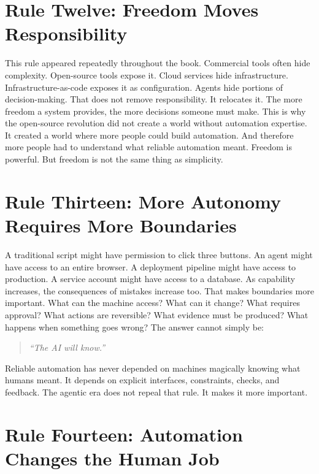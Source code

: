 \documentclass[11pt,twoside]{book}
\begin{document}
\section*{Rule Twelve: Freedom Moves Responsibility}

This rule appeared repeatedly throughout the book.
Commercial tools often hide complexity.
Open-source tools expose it.
Cloud services hide infrastructure.
Infrastructure-as-code exposes it as configuration.
Agents hide portions of decision-making.
That does not remove responsibility.
It relocates it.
The more freedom a system provides, the more decisions someone must make.
This is why the open-source revolution did not create a world without automation expertise.
It created a world where more people could build automation.
And therefore more people had to understand what reliable automation meant.
Freedom is powerful.
But freedom is not the same thing as simplicity.

\section*{Rule Thirteen: More Autonomy Requires More Boundaries}

A traditional script might have permission to click three buttons.
An agent might have access to an entire browser.
A deployment pipeline might have access to production.
A service account might have access to a database.
As capability increases, the consequences of mistakes increase too.
That makes boundaries more important.
What can the machine access?
What can it change?
What requires approval?
What actions are reversible?
What evidence must be produced?
What happens when something goes wrong?
The answer cannot simply be:
\begin{quote}
\emph{``The AI will know.''}
\end{quote}
Reliable automation has never depended on machines magically knowing what humans meant.
It depends on explicit interfaces, constraints, checks, and feedback.
The agentic era does not repeal that rule.
It makes it more important.

\section*{Rule Fourteen: Automation Changes the Human Job}
\end{document}
